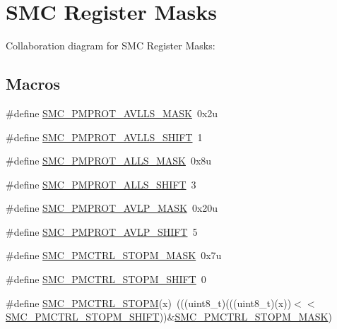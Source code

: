 \hypertarget{group___s_m_c___register___masks}{}\section{S\+MC Register Masks}
\label{group___s_m_c___register___masks}
Collaboration diagram for S\+MC Register Masks\+:
\subsection*{Macros}
\begin{DoxyCompactItemize}
\item 
\#define \hyperlink{group___s_m_c___register___masks_ga62e9f3c7e74a3e5b80b0fae8a896640d}{S\+M\+C\+\_\+\+P\+M\+P\+R\+O\+T\+\_\+\+A\+V\+L\+L\+S\+\_\+\+M\+A\+SK}~0x2u
\item 
\#define \hyperlink{group___s_m_c___register___masks_gad625b387a627eb3a69f3a26edc0096b8}{S\+M\+C\+\_\+\+P\+M\+P\+R\+O\+T\+\_\+\+A\+V\+L\+L\+S\+\_\+\+S\+H\+I\+FT}~1
\item 
\#define \hyperlink{group___s_m_c___register___masks_ga79d87e312be895d4f2bdfdda8c947600}{S\+M\+C\+\_\+\+P\+M\+P\+R\+O\+T\+\_\+\+A\+L\+L\+S\+\_\+\+M\+A\+SK}~0x8u
\item 
\#define \hyperlink{group___s_m_c___register___masks_gac6cb1305b9cb329a8bb903036893db11}{S\+M\+C\+\_\+\+P\+M\+P\+R\+O\+T\+\_\+\+A\+L\+L\+S\+\_\+\+S\+H\+I\+FT}~3
\item 
\#define \hyperlink{group___s_m_c___register___masks_ga30602dafb393b5d9c52f0c75e1d78210}{S\+M\+C\+\_\+\+P\+M\+P\+R\+O\+T\+\_\+\+A\+V\+L\+P\+\_\+\+M\+A\+SK}~0x20u
\item 
\#define \hyperlink{group___s_m_c___register___masks_gae13777e671c1caf2d10809999574fed4}{S\+M\+C\+\_\+\+P\+M\+P\+R\+O\+T\+\_\+\+A\+V\+L\+P\+\_\+\+S\+H\+I\+FT}~5
\item 
\#define \hyperlink{group___s_m_c___register___masks_ga8df79d8a16a6d12e3b343eec59d9453c}{S\+M\+C\+\_\+\+P\+M\+C\+T\+R\+L\+\_\+\+S\+T\+O\+P\+M\+\_\+\+M\+A\+SK}~0x7u
\item 
\#define \hyperlink{group___s_m_c___register___masks_gaac7423086f31a8fbbfc8d18b1a876f26}{S\+M\+C\+\_\+\+P\+M\+C\+T\+R\+L\+\_\+\+S\+T\+O\+P\+M\+\_\+\+S\+H\+I\+FT}~0
\item 
\#define \hyperlink{group___s_m_c___register___masks_gaa2ea36f819a21ef6b513564dc1453958}{S\+M\+C\+\_\+\+P\+M\+C\+T\+R\+L\+\_\+\+S\+T\+O\+PM}(x)~(((uint8\+\_\+t)(((uint8\+\_\+t)(x))$<$$<$\hyperlink{group___s_m_c___register___masks_gaac7423086f31a8fbbfc8d18b1a876f26}{S\+M\+C\+\_\+\+P\+M\+C\+T\+R\+L\+\_\+\+S\+T\+O\+P\+M\+\_\+\+S\+H\+I\+FT}))\&\hyperlink{group___s_m_c___register___masks_ga8df79d8a16a6d12e3b343eec59d9453c}{S\+M\+C\+\_\+\+P\+M\+C\+T\+R\+L\+\_\+\+S\+T\+O\+P\+M\+\_\+\+M\+A\+SK})
$$
\end{DoxyCompactItemize}
